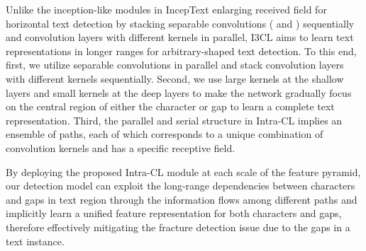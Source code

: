 Unlike the inception-like modules in IncepText \citep{inceptext} enlarging received field for horizontal text detection by stacking separable convolutions ( and ) sequentially and convolution layers with different kernels in parallel, I3CL aims to learn text representations in longer ranges for arbitrary-shaped text detection. To this end, first, we utilize separable convolutions in parallel and stack convolution layers with different kernels sequentially. Second, we use large kernels at the shallow layers and small kernels at the deep layers to make the network gradually focus on the central region of either the character or gap to learn a complete text representation. Third, the parallel and serial structure in Intra-CL implies an ensemble of  paths, each of which corresponds to a unique combination of convolution kernels and has a specific receptive field.

By deploying the proposed Intra-CL module at each scale of the feature pyramid, our detection model can exploit the long-range dependencies between characters and gaps in text region through the information flows among different paths and implicitly learn a unified feature representation for both characters and gaps, therefore effectively mitigating the fracture detection issue due to the gaps in a text instance.


